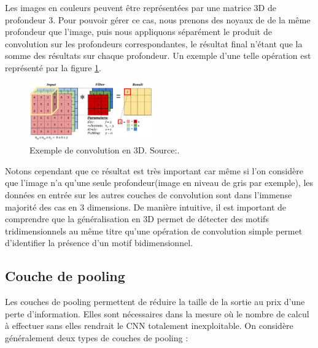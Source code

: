 Les images en couleurs peuvent être représentées par une matrice 3D de profondeur 3. Pour pouvoir gérer ce cas, nous prenons des noyaux de de la même profondeur que l'image, puis nous appliquons séparément le produit de convolution sur les profondeurs correspondantes, le résultat final n'étant que la somme des résultats sur chaque profondeur. Un exemple d'une telle opération est représenté par la figure \ref{CNN_3D}.

\begin{figure}[!h]
\centering
\includegraphics[width=150pt]{images/cnn/CNN_3D.png}
\caption{Exemple de convolution en 3D. Source:\cite{3D_convolution}.}
\label{CNN_3D}
\end{figure}

Notons cependant que ce résultat est très important car même si l'on considère que l'image n'a qu'une seule profondeur(image en niveau de gris par exemple), les données en entrée sur les autres couches de convolution sont dans l'immense majorité des cas en 3 dimensions. De manière intuitive, il est important de comprendre que la généralisation en 3D permet de détecter des motifs tridimensionnels au même titre qu'une opération de convolution simple permet d'identifier la présence d'un motif bidimensionnel. 

\subsection{Couche de pooling}

Les couches de pooling permettent de réduire la taille de la sortie au prix d'une perte d'information. Elles sont nécessaires dans la mesure où le nombre de calcul à effectuer sans elles rendrait le CNN  totalement inexploitable. On considère généralement deux types de couches de pooling :

